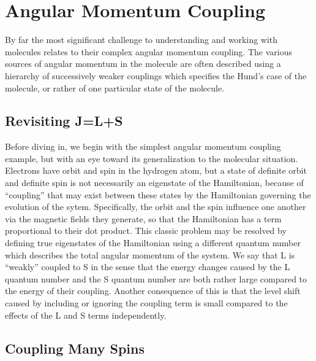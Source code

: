 \section{Angular Momentum Coupling}

By far the most significant challenge to understanding and working with molecules relates to their complex angular momentum coupling. 
The various sources of angular momentum in the molecule are often described using a hierarchy of successively weaker couplings which specifies the Hund's case of the molecule, or rather of one particular state of the molecule.


\subsection{Revisiting J=L+S}

Before diving in, we begin with the simplest angular momentum coupling example, but with an eye toward its generalization to the molecular situation.
Electrons have orbit and spin in the hydrogen atom, but a state of definite orbit and definite spin is not necessarily an eigenstate of the Hamiltonian, because of ``coupling'' that may exist between these states by the Hamiltonian governing the evolution of the sytem.
Specifically, the orbit and the spin influence one another via the magnetic fields they generate, so that the Hamiltonian has a term proportional to their dot product.
This classic problem may be resolved by defining true eigenstates of the Hamiltonian using a different quantum number which describes the total angular momentum of the system.
We say that L is ``weakly'' coupled to S in the sense that the energy changes caused by the L quantum number and the S quantum number are both rather large compared to the energy of their coupling.
Another consequence of this is that the level shift caused by including or ignoring the coupling term is small compared to the effects of the L and S terms independently.

\subsection{Coupling Many Spins}

